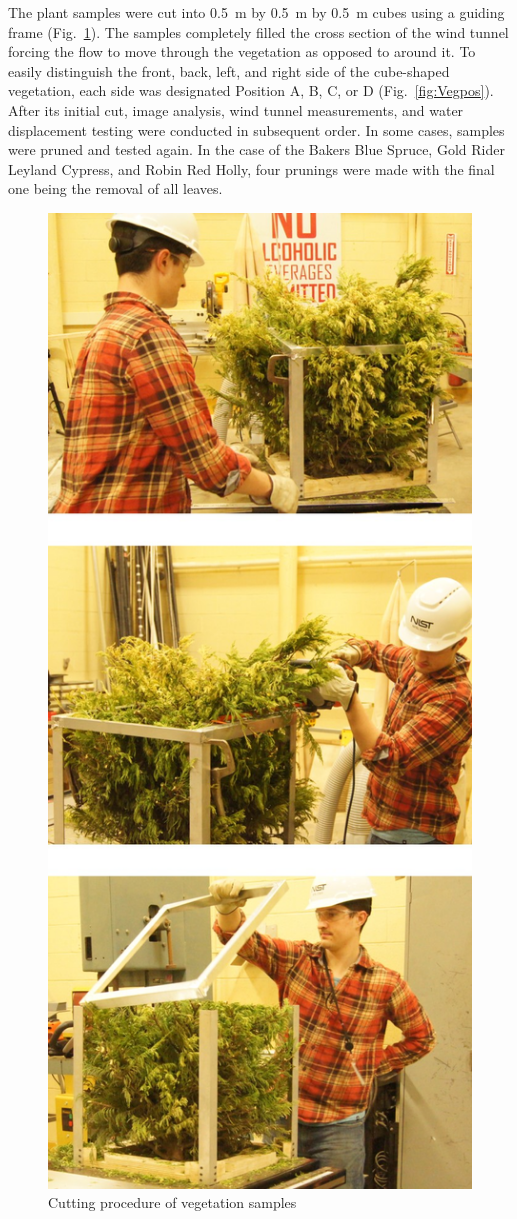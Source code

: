 \documentclass[12pt]{article}
\begin{document}
The plant samples were cut into 0.5~\si{m} by 0.5~\si{m} by 0.5~\si{m} cubes using a guiding frame (Fig.~\ref{fig:Sampleprep}). The samples completely filled the cross section of the wind tunnel forcing the flow to move through the vegetation as opposed to around it. To easily distinguish the front, back, left, and right side of the cube-shaped vegetation, each side was designated Position A, B, C, or D (Fig.~\ref{fig:Vegpos}). After its initial cut, image analysis, wind tunnel measurements, and water displacement testing were conducted in subsequent order. In some cases, samples were pruned and tested again. In the case of the Bakers Blue Spruce, Gold Rider Leyland Cypress, and Robin Red Holly, four prunings were made with the final one being the removal of all leaves.

\begin{figure} [!]
	\centering 	
	\includegraphics[height=8.in,keepaspectratio]{Picture2.jpg}
	\caption{Cutting procedure of vegetation samples}
	\label{fig:Sampleprep}
\end{figure}
\end{document}
